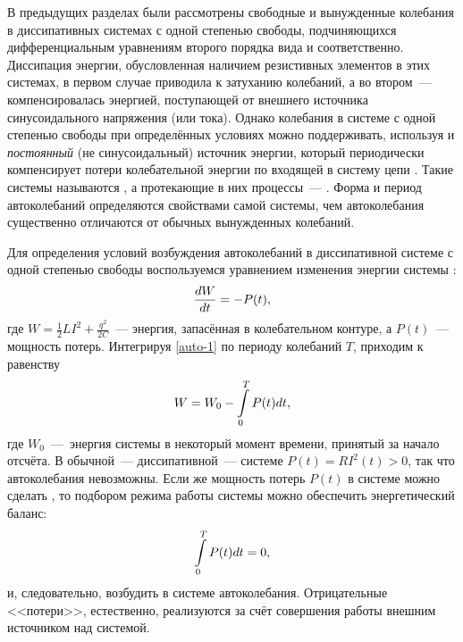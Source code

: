 \label{sec:auto}

В предыдущих разделах были рассмотрены свободные и вынужденные колебания в
диссипативных системах с одной степенью свободы, подчиняющихся дифференциальным
уравнениям второго порядка вида  и 
соответственно. Диссипация энергии, обусловленная наличием резистивных элементов
в этих системах, в первом случае приводила к затуханию колебаний, а во
втором~--- компенсировалась энергией, поступающей от
внешнего источника синусоидального напряжения (или тока). Однако колебания в
системе с одной степенью свободы при определённых условиях можно поддерживать,
используя и \emph{постоянный} (не синусоидальный) источник энергии, 
который периодически компенсирует потери колебательной энергии по входящей 
в систему цепи . 
Такие системы называются , а протекающие в
них процессы~--- . Форма и период автоколебаний
определяются свойствами самой системы, чем автоколебания существенно отличаются
от обычных вынужденных колебаний.

Для определения условий возбуждения автоколебаний в диссипативной системе с
одной степенью свободы воспользуемся уравнением изменения энергии 
системы :
\begin{equation}
	\eqmark{auto-1}
	\frac{dW}{dt}=-P(t),
\end{equation}
где $W=\frac12 LI^2+ \frac{q^2}{2C}$~--- энергия, запасённая в колебательном контуре,
а $P(t)$~--- мощность потерь. 
Интегрируя \eqref{auto-1} по периоду колебаний $T$, приходим 
к равенству
\begin{equation}
	\eqmark{auto-2}
	W=W_0-\int\limits_{0}^{T}P(t)dt,
\end{equation}
где $W_0$~---~энергия системы в некоторый момент времени, принятый за начало
отсчёта. В обычной~--- диссипативной~--- системе $P(t)=RI^{2}(t)>0$, 
так что автоколебания невозможны. 
Если же мощность потерь $P(t)$ в системе можно сделать , 
то подбором режима работы системы можно обеспечить энергетический баланс:
\begin{equation}
	\eqmark{auto-3}
	\int\limits_{0}^{T} P(t) dt = 0,
\end{equation}
и, следовательно, возбудить в системе автоколебания. Отрицательные
<<потери>>, естественно, реализуются за счёт совершения 
работы внешним источником над системой.

